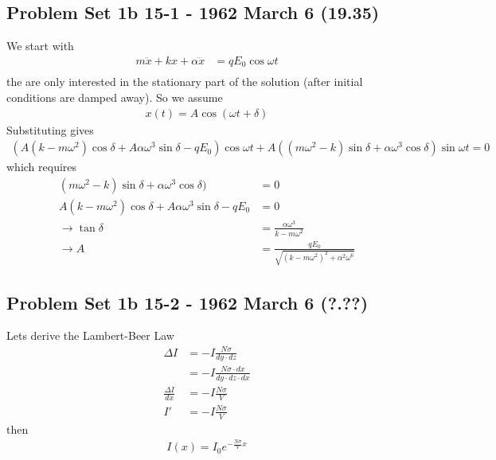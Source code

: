 \documentclass[../main.tex]{subfiles}
\begin{document}
\subsection{Problem Set 1b  15-1 - 1962 March 6 (19.35)}
We start with
\begin{align}
m\ddot{x}+kx+\alpha\dddot{x}&=qE_0\cos\omega t\\
\end{align}
the are only interested in the stationary part of the solution (after initial conditions are damped away). So we assume
\begin{align}
x(t)=A\cos(\omega t+\delta)
\end{align}
Substituting gives
\begin{align}
(A(k-m\omega^2)\cos\delta+A\alpha\omega^3\sin\delta-qE_0)\cos\omega t+A((m\omega^2-k)\sin\delta+\alpha\omega^3\cos\delta)\sin\omega t=0
\end{align}
which requires
\begin{align}
(m\omega^2-k)\sin\delta+\alpha\omega^3\cos\delta)&=0\\
A(k-m\omega^2)\cos\delta+A\alpha\omega^3\sin\delta-qE_0&=0\\
\rightarrow \tan\delta&=\frac{\alpha\omega^3}{k-m\omega^2}\\
\rightarrow A&=\frac{qE_0}{\sqrt{(k-m\omega^2)^2+\alpha^2\omega^6}}
\end{align}



\subsection{Problem Set 1b  15-2 - 1962 March 6 (?.??)}
Lets derive the Lambert-Beer Law
\begin{align}
\Delta I
&=-I \frac{N\sigma}{dy\cdot dz}\\
&=-I \frac{N\sigma\cdot dx}{dy\cdot dz\cdot dx}\\
\frac{\Delta I}{dx}&=-I\frac{N\sigma}{V}\\
I'&=-I\frac{N\sigma}{V}
\end{align}
then
\begin{align}
I(x)=I_0e^{-\frac{N\sigma}{V}x}
\end{align}
\end{document}
